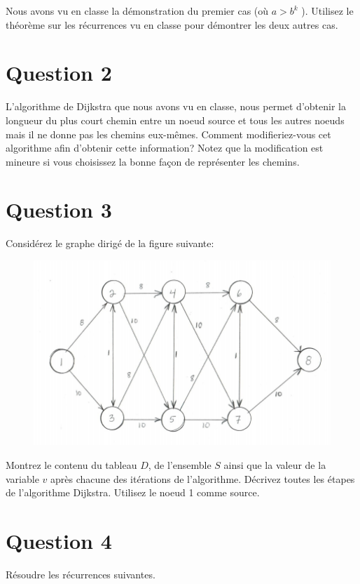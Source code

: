\documentclass[12pt]{article}
\begin{document}
Nous avons vu en classe la démonstration du premier cas (où  \(a > b^k\)
).
Utilisez le théorème sur les récurrences vu en classe pour démontrer les
deux autres cas.


\newpage

\section*{Question 2}
L’algorithme de Dijkstra que nous avons vu en classe, nous permet
d’obtenir la longueur du plus court chemin entre un noeud source et
tous les autres noeuds mais il ne donne pas les chemins eux-mêmes. Comment modifieriez-vous cet algorithme afin d’obtenir cette information? Notez que la modification est mineure si vous choisissez la bonne façon de représenter les chemins.

\newpage

\section*{Question 3}
Considérez le graphe dirigé de la figure suivante:

\begin{figure}[H]
	\centering
	\includegraphics[width=12cm]{q3} 
\end{figure}

Montrez le contenu du tableau \(D\), de l’ensemble \(S\) ainsi que la valeur de la variable \(v\) après chacune des itérations de l’algorithme. Décrivez toutes les étapes de l’algorithme Dijkstra. Utilisez le noeud 1 comme source.

\newpage

\section*{Question 4}
Résoudre les récurrences suivantes. \\
\end{document}
